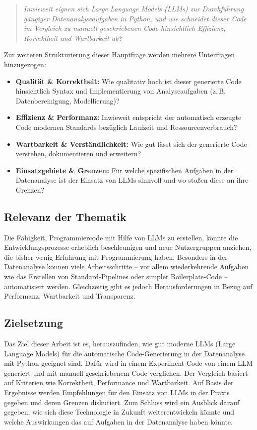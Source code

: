 \documentclass[11pt,a4paper]{article}
\begin{document}
\begin{quote}
    \emph{Inwieweit eignen sich Large Language Models (LLMs) zur Durchführung gängiger Datenanalyseaufgaben in Python, und wie schneidet dieser Code im Vergleich zu manuell geschriebenen Code hinsichtlich Effizienz, Korrektheit und Wartbarkeit ab?}
\end{quote}

Zur weiteren Strukturierung dieser Hauptfrage werden mehrere Unterfragen hinzugezogen:
\begin{itemize}
    \item \textbf{Qualität \& Korrektheit:} Wie qualitativ hoch ist dieser generierte Code hinsichtlich Syntax und Implementierung von Analyseaufgaben (z.\,B. Datenbereinigung, Modellierung)?
    \item \textbf{Effizienz \& Performanz:} Inwieweit entspricht der automatisch erzeugte Code modernen Standards bezüglich Laufzeit und Ressourcenverbrauch?
    \item \textbf{Wartbarkeit \& Verständlichkeit:} Wie gut lässt sich der generierte Code verstehen, dokumentieren und erweitern?
    \item \textbf{Einsatzgebiete \& Grenzen:} Für welche spezifischen Aufgaben in der Datenanalyse ist der Einsatz von LLMs sinnvoll und wo stoßen diese an ihre Grenzen?
\end{itemize}

\subsection{Relevanz der Thematik}
Die Fähigkeit, Programmiercode mit Hilfe von LLMs zu erstellen, könnte die Entwicklungsprozesse erheblich beschleunigen und neue Nutzergruppen anziehen, die bisher wenig Erfahrung mit Programmierung haben. Besonders in der Datenanalyse können viele Arbeitsschritte – vor allem wiederkehrende Aufgaben wie das Erstellen von Standard-Pipelines oder simpler Boilerplate-Code – automatisiert werden. Gleichzeitig gibt es jedoch Herausforderungen in Bezug auf Performanz, Wartbarkeit und Transparenz.

\subsection{Zielsetzung}
Das Ziel dieser Arbeit ist es, herauszufinden, wie gut moderne LLMs (Large Language Models) für die automatische Code-Generierung in der Datenanalyse mit Python geeignet sind. Dafür wird in einem Experiment Code von einem LLM generiert und mit manuell geschriebenem Code verglichen. Der Vergleich basiert auf Kriterien wie Korrektheit, Performance und Wartbarkeit. Auf Basis der Ergebnisse werden Empfehlungen für den Einsatz von LLMs in der Praxis gegeben und deren Grenzen diskutiert. Zum Schluss wird ein Ausblick darauf gegeben, wie sich diese Technologie in Zukunft weiterentwickeln könnte und welche Auswirkungen das auf Aufgaben in der Datenanalyse haben könnte\cite{chen2021evaluatinglargelanguagemodels,evalplus}.
\end{document}
